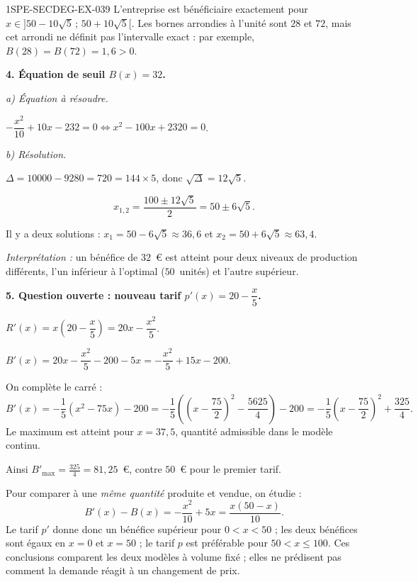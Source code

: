 \begin{corrige}{1SPE-SECDEG-EX-039}
L'entreprise est bénéficiaire exactement pour
$x\in]50-10\sqrt{5}\,;\,50+10\sqrt{5}[$.
Les bornes arrondies à l'unité sont $28$ et $72$, mais cet arrondi ne définit
pas l'intervalle exact : par exemple, $B(28)=B(72)=1{,}6>0$.

\medskip
\textbf{4. Équation de seuil $B(x) = 32$.}

\textit{a) Équation à résoudre.}


$-\dfrac{x^2}{10} + 10x - 232 = 0 \iff x^2 - 100x + 2320 = 0$.

\textit{b) Résolution.}

$\Delta = 10000 - 9280 = 720 = 144 \times 5$, donc $\sqrt{\Delta} = 12\sqrt{5}$.

\[x_{1,2} = \frac{100 \pm 12\sqrt{5}}{2} = 50 \pm 6\sqrt{5}.\]

Il y a deux solutions : $x_1 = 50 - 6\sqrt{5} \approx 36{,}6$ et $x_2 = 50 + 6\sqrt{5} \approx 63{,}4$.

\textit{Interprétation :} un bénéfice de $32$~\euro{} est atteint pour deux niveaux de production différents, l'un inférieur à l'optimal ($50$~unités) et l'autre supérieur.

\medskip
\textbf{5. Question ouverte : nouveau tarif $p'(x) = 20 - \dfrac{x}{5}$.}


$R'(x) = x\!\left(20 - \dfrac{x}{5}\right) = 20x - \dfrac{x^2}{5}$.

$B'(x) = 20x - \dfrac{x^2}{5} - 200 - 5x = -\dfrac{x^2}{5} + 15x - 200$.

On complète le carré :
\[B'(x)=-\frac{1}{5}(x^2-75x)-200
=-\frac{1}{5}\left(\left(x-\frac{75}{2}\right)^2-\frac{5625}{4}\right)-200
=-\frac{1}{5}\left(x-\frac{75}{2}\right)^2+\frac{325}{4}.\]
Le maximum est atteint pour $x=37{,}5$, quantité admissible dans le modèle continu.

Ainsi $B'_{\max}=\frac{325}{4}=81{,}25$~\euro, contre $50$~\euro{} pour le premier tarif.

Pour comparer à une \emph{même quantité} produite et vendue, on étudie :
\[B'(x)-B(x)=-\frac{x^2}{10}+5x=\frac{x(50-x)}{10}.\]
Le tarif $p'$ donne donc un bénéfice supérieur pour $0<x<50$ ;
les deux bénéfices sont égaux en $x=0$ et $x=50$ ; le tarif $p$ est préférable
pour $50<x\leq100$. Ces conclusions comparent les deux modèles à volume fixé ;
elles ne prédisent pas comment la demande réagit à un changement de prix.

\end{corrige}
